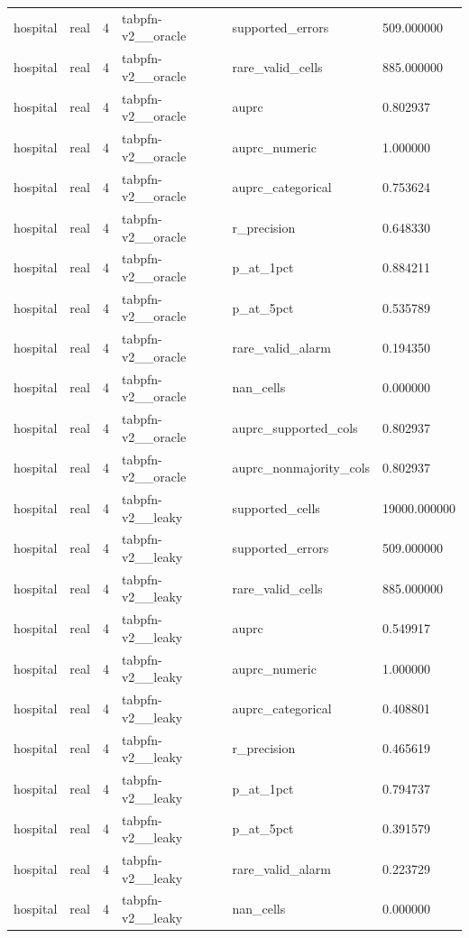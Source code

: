 \begin{tabular}{llllll}
hospital & real & 4 & tabpfn-v2\_\_oracle & supported\_errors & 509.000000 \\
hospital & real & 4 & tabpfn-v2\_\_oracle & rare\_valid\_cells & 885.000000 \\
hospital & real & 4 & tabpfn-v2\_\_oracle & auprc & 0.802937 \\
hospital & real & 4 & tabpfn-v2\_\_oracle & auprc\_numeric & 1.000000 \\
hospital & real & 4 & tabpfn-v2\_\_oracle & auprc\_categorical & 0.753624 \\
hospital & real & 4 & tabpfn-v2\_\_oracle & r\_precision & 0.648330 \\
hospital & real & 4 & tabpfn-v2\_\_oracle & p\_at\_1pct & 0.884211 \\
hospital & real & 4 & tabpfn-v2\_\_oracle & p\_at\_5pct & 0.535789 \\
hospital & real & 4 & tabpfn-v2\_\_oracle & rare\_valid\_alarm & 0.194350 \\
hospital & real & 4 & tabpfn-v2\_\_oracle & nan\_cells & 0.000000 \\
hospital & real & 4 & tabpfn-v2\_\_oracle & auprc\_supported\_cols & 0.802937 \\
hospital & real & 4 & tabpfn-v2\_\_oracle & auprc\_nonmajority\_cols & 0.802937 \\
hospital & real & 4 & tabpfn-v2\_\_leaky & supported\_cells & 19000.000000 \\
hospital & real & 4 & tabpfn-v2\_\_leaky & supported\_errors & 509.000000 \\
hospital & real & 4 & tabpfn-v2\_\_leaky & rare\_valid\_cells & 885.000000 \\
hospital & real & 4 & tabpfn-v2\_\_leaky & auprc & 0.549917 \\
hospital & real & 4 & tabpfn-v2\_\_leaky & auprc\_numeric & 1.000000 \\
hospital & real & 4 & tabpfn-v2\_\_leaky & auprc\_categorical & 0.408801 \\
hospital & real & 4 & tabpfn-v2\_\_leaky & r\_precision & 0.465619 \\
hospital & real & 4 & tabpfn-v2\_\_leaky & p\_at\_1pct & 0.794737 \\
hospital & real & 4 & tabpfn-v2\_\_leaky & p\_at\_5pct & 0.391579 \\
hospital & real & 4 & tabpfn-v2\_\_leaky & rare\_valid\_alarm & 0.223729 \\
hospital & real & 4 & tabpfn-v2\_\_leaky & nan\_cells & 0.000000 \\

\end{tabular}
